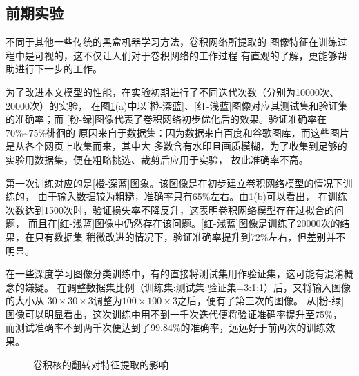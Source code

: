 \setcounter{table}{0}
\setcounter{figure}{0}

\subsection{\hei\xiaosan\textbf{前期实验}}

  不同于其他一些传统的黑盒机器学习方法，卷积网络所提取的
  图像特征在训练过程中是可视的，这不仅让人们对于卷积网络的工作过程
  有直观的了解，更能够帮助进行下一步的工作。

  为了改进本文模型的性能，在实验初期进行了不同迭代次数（分别为10000次、20000次）的实验，
  在图\ref{Figure.Fourth.1}(a)中以[橙-深蓝]、[红-浅蓝]图像对应其测试集和验证集的准确率；而
  [粉-绿]图像代表了卷积网络初步优化后的效果。验证准确率在70\%\textasciitilde75\%徘徊的
  原因来自于数据集：因为数据来自百度和谷歌图库，而这些图片是从各个网页上收集而来，其中大
  多数含有水印且画质模糊，为了收集到足够的实验用数据集，便在粗略挑选、裁剪后应用于实验，
  故此准确率不高。

  第一次训练对应的是[橙-深蓝]图象。该图像是在初步建立卷积网络模型的情况下训练的，
  由于输入数据较为粗糙，准确率只有65\%左右。由\ref{Figure.Fourth.1}(b)可以看出，
  在训练次数达到1500次时，验证损失率不降反升，这表明卷积网络模型存在过拟合的问题，
  而且在[红-浅蓝]图像中仍然存在该问题。[红-浅蓝]图像是训练了20000次的结果，在只有数据集
  稍微改进的情况下，验证准确率提升到72\%左右，但差别并不明显。

  在一些深度学习图像分类训练中，有的直接将测试集用作验证集，这可能有混淆概念的嫌疑。
  在调整数据集比例（训练集:测试集:验证集=3:1:1）后，又将输入图像的大小从
  $30\times30\times3$调整为$100\times100\times3$之后，便有了第三次的图像。
  从[粉-绿]图像可以明显看出，这次训练中用不到一千次迭代便将验证准确率提升至75\%，
  而测试准确率不到两千次便达到了99.84\%的准确率，远远好于前两次的训练效果。

    \begin{figure}[H]
      \centering
      \caption{卷积核的翻转对特征提取的影响}
      \label{Figure.Fourth.1}
    \end{figure}

